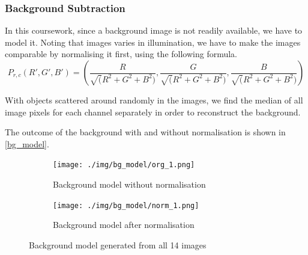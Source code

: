 \documentclass[main.tex]{subfiles}
\begin{document}
\subsubsection*{Background Subtraction}
In this coursework, since a background image is not readily available, we have to model it. Noting that images varies in illumination, we have to make the images comparable by normalising it first, using the following formula.
$$ P_{r,c}(R',G',B')=(\frac{R}{\sqrt(R^2+G^2+B^2)},\frac{G}{\sqrt(R^2+G^2+B^2)},\frac{B}{\sqrt(R^2+G^2+B^2)})$$

With objects scattered around randomly in the images, we find the median of all image pixels for each channel separately in order to reconstruct the background.

The outcome of the background with and without normalisation is shown in \autoref{bg_model}.

\begin{figure}[!h]
  \centering
  \begin{subfigure}[b]{.45\textwidth}
    \centering
    \texttt{[image: ./img/bg\_model/org\_1.png]}
    \caption{Background model without normalisation}
  \end{subfigure}
  \begin{subfigure}[b]{.45\textwidth}
    \centering
    \texttt{[image: ./img/bg\_model/norm\_1.png]}
    \caption{Background model after normalisation}
  \end{subfigure}
  \caption{Background model generated from all 14 images}
  \label{bg_model}
\end{figure}
\end{document}
